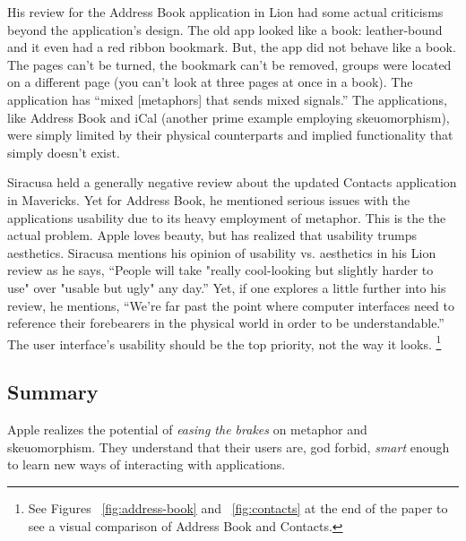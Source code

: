 \documentclass[11pt, oneside]{article}
\begin{document}
His review for the Address Book application in Lion had some actual criticisms beyond the application's design. The old app looked like a book: leather-bound and it even had a red ribbon bookmark. But, the app did not behave like a book. The pages can't be turned, the bookmark can't be removed, groups were located on a different page (you can't look at three pages at once in a book). The application has ``mixed [metaphors] that sends mixed signals.''  The applications, like Address Book and iCal (another prime example employing skeuomorphism), were simply limited by their physical counterparts and implied functionality that simply doesn't exist. \cite{ars-technica-lion}

Siracusa held a generally negative review about the updated Contacts application in Mavericks. Yet for Address Book, he mentioned serious issues with the applications usability due to its heavy employment of metaphor. This is the the actual problem. Apple loves beauty, but has realized that usability trumps aesthetics. Siracusa mentions his opinion of usability vs. aesthetics in his Lion review as he says, ``People will take "really cool-looking but slightly harder to use" over "usable but ugly" any day.'' Yet, if one explores a little further into his review, he mentions, ``We're far past the point where computer interfaces need to reference their forebearers in the physical world in order to be understandable.'' The user interface's usability should be the top priority, not the way it looks. \footnote{See Figures ~\ref{fig:address-book} and ~\ref{fig:contacts} at the end of the paper to see a visual comparison of Address Book and Contacts.}
 
\subsection{Summary}
Apple realizes the potential of \textit{easing the brakes} on metaphor and skeuomorphism. They understand that their users are, god forbid, \textit{smart} enough to learn new ways of interacting with applications.
\end{document}
